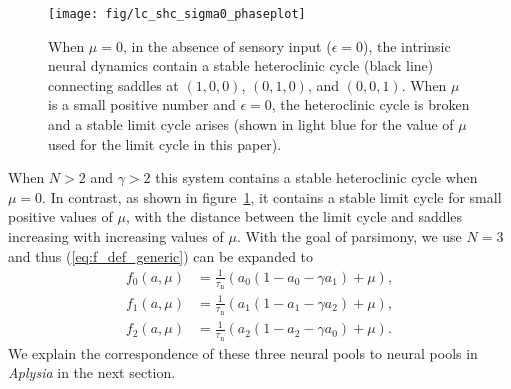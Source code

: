 \begin{figure}
    \centering
    \texttt{[image: fig/lc\_shc\_sigma0\_phaseplot]}
    \caption[Isolated trajectories of the SHC and limit cycle]{
        When $\mu = 0$, in the absence of sensory input ($\epsilon =
        0$), the intrinsic neural dynamics contain a stable heteroclinic cycle
        (black line) connecting saddles at $(1,0,0)$, $(0,1,0)$, and $(0,0,1)$.
        When $\mu$ is a small positive number and $\epsilon = 0$, the
        heteroclinic cycle is broken and a stable limit cycle arises (shown in
        light blue for the value of $\mu$ used for the limit cycle in this
        paper).
    }
    \label{fig:lc_and_shc_phaseplot}
\end{figure}

 When $N > 2$
and $\gamma > 2$ this system contains a stable heteroclinic cycle when $\mu =
0$.  In contrast, as shown in figure~\ref{fig:lc_and_shc_phaseplot}, it contains a stable limit cycle for small positive values of
$\mu$, with the distance between the limit cycle and saddles increasing with
increasing values of $\mu$.  With the goal of parsimony, we use
$N = 3$ and thus (\ref{eq:f_def_generic}) can be expanded to
\begin{align}
    f_0(a, \mu) &= \frac{1}{\tau_\textrm{n}}(a_0 (1 - a_0 - \gamma a_1) + \mu),\\
    f_1(a, \mu) &= \frac{1}{\tau_\textrm{n}}(a_1 (1 - a_1 - \gamma a_2) + \mu),\\
    f_2(a, \mu) &= \frac{1}{\tau_\textrm{n}}(a_2 (1 - a_2 - \gamma a_0) + \mu).
\end{align}
We explain the correspondence of these three neural pools to neural
pools in \textit{Aplysia} in the next section.


